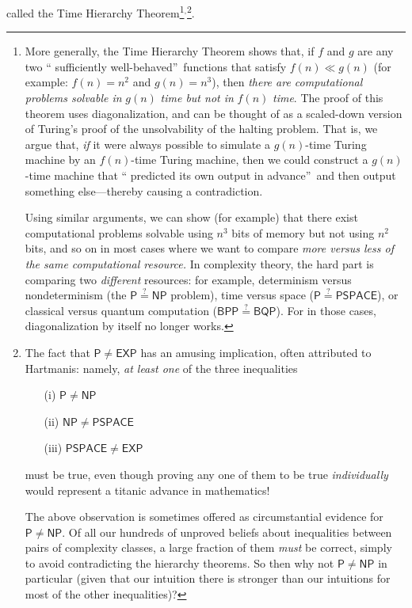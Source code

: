 \documentclass[12pt,onecolumn]{article}%
\begin{document}
\cite{hs} called the Time Hierarchy Theorem\footnote{More generally, the Time
Hierarchy Theorem shows that, if $f$ and $g$ are any two \textquotedblleft
sufficiently well-behaved\textquotedblright\  functions that satisfy $f\left(
n\right)  \ll g\left(  n\right)  $ (for example: $f\left(  n\right)  =n^{2}%
$ and $g\left(  n\right)  =n^{3}$), then \textit{there are computational
problems solvable in }$g\left(  n\right)  $\textit{ time but not in
}$f\left(  n\right)  $\textit{ time}. The proof of this theorem uses
diagonalization, and can be thought of as a scaled-down version of Turing's
proof of the unsolvability of the halting problem. That is, we argue that,
\textit{if} it were always possible to simulate a $g\left(  n\right)  $-time
Turing machine by an $f\left(  n\right)  $-time Turing machine, then we could
construct a $g\left(  n\right)  $-time machine that \textquotedblleft
predicted its own output in advance\textquotedblright\  and then output
something else---thereby causing a contradiction.
\par
Using similar arguments, we can show (for example) that there exist
computational problems solvable using $n^{3}$ bits of memory but not using
$n^{2}$ bits, and so on in most cases where we want to compare \textit{more
versus less of the same computational resource.} In complexity theory, the
hard part is comparing two \textit{different} resources: for example,
determinism versus nondeterminism (the $\mathsf{P}\overset{?}{=}\mathsf{NP}%
$ problem), time versus space ($\mathsf{P\overset{?}{=}PSPACE}$), or
classical versus quantum computation ($\mathsf{BPP\overset{?}{=}BQP}$). For
in those cases, diagonalization by itself no longer works.}$^{,}$\footnote{The
fact that $\mathsf{P}\neq\mathsf{EXP}$ has an amusing implication, often
attributed to Hartmanis: namely, \textit{at least one} of the three
inequalities
\par
\begin{enumerate}
\item[(i)] $\mathsf{P}\neq\mathsf{NP}$
\par
\item[(ii)] $\mathsf{NP}\neq\mathsf{PSPACE}$
\par
\item[(iii)] $\mathsf{PSPACE}\neq\mathsf{EXP}$
\end{enumerate}
\par
\noindent must be true, even though proving any one of them to be true
\textit{individually} would represent a titanic advance in mathematics!
\par
The above observation is sometimes offered as circumstantial evidence for
$\mathsf{P}\neq\mathsf{NP}$. Of all our hundreds of unproved beliefs about
inequalities between pairs of complexity classes, a large fraction of them
\textit{must} be correct, simply to avoid contradicting the hierarchy
theorems. So then why not $\mathsf{P}\neq\mathsf{NP}$ in particular (given
that our intuition there is stronger than our intuitions for most of the other
inequalities)?}.
\end{document}
